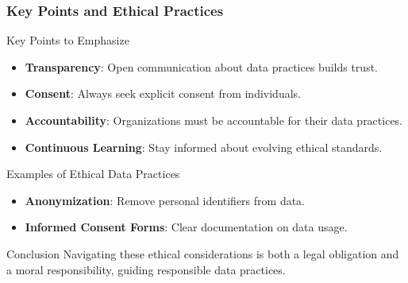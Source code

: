 \documentclass[aspectratio=169]{beamer}
\begin{document}
\begin{frame}[fragile]
    \frametitle{Key Points and Ethical Practices}
    
    \begin{block}{Key Points to Emphasize}
        \begin{itemize}
            \item \textbf{Transparency}: Open communication about data practices builds trust.
            \item \textbf{Consent}: Always seek explicit consent from individuals.
            \item \textbf{Accountability}: Organizations must be accountable for their data practices.
            \item \textbf{Continuous Learning}: Stay informed about evolving ethical standards.
        \end{itemize}
    \end{block}

    \begin{block}{Examples of Ethical Data Practices}
        \begin{itemize}
            \item \textbf{Anonymization}: Remove personal identifiers from data.
            \item \textbf{Informed Consent Forms}: Clear documentation on data usage.
        \end{itemize}
    \end{block}

    \begin{block}{Conclusion}
        Navigating these ethical considerations is both a legal obligation and a moral responsibility, guiding responsible data practices.
    \end{block}
\end{frame}
\end{document}

